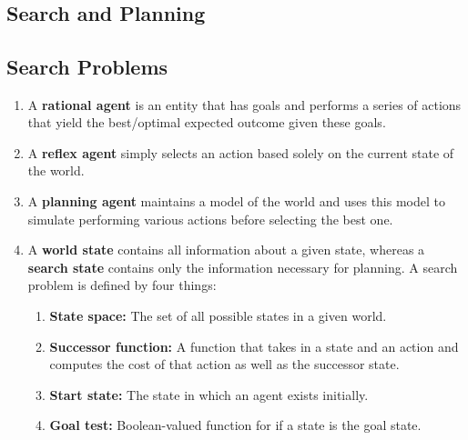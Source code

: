 \documentclass[10pt]{article}
\begin{document}
\date{}
\author{}
\title{\vspace{-5ex}  \vspace{-5ex}}
\maketitle

\begin{multicols}{2}

\section{Search and Planning}
\begin{addmargin}[0.8em]{0.5em}
    \subsection{Search Problems}
    \begin{enumerate}[label=(\alph*)]
         \item A \textbf{rational agent} is an entity that has goals and performs a series of actions that yield the best/optimal expected outcome given these goals.
         \item A \textbf{reflex agent} simply selects an action based solely on the current state of the world.
         \item A \textbf{planning agent} maintains a model of the world and uses this model to simulate performing various actions before selecting the best one.
         
         \item A \textbf{world state} contains all information about a given state, whereas a \textbf{search state} contains only the information necessary for planning. A search problem is defined by four things:
         \begin{enumerate}[label=\roman*.]
             \item \textbf{State space:} The set of all possible states in a given world.
             \item \textbf{Successor function:} A function that takes in a state and an action and computes the cost of that action as well as the successor state.
             \item \textbf{Start state:} The state in which an agent exists initially.
             \item \textbf{Goal test:} Boolean-valued function for if a state is the goal state.
         \end{enumerate}
         

\end{enumerate}
\end{addmargin}
\end{multicols}
\end{document}
